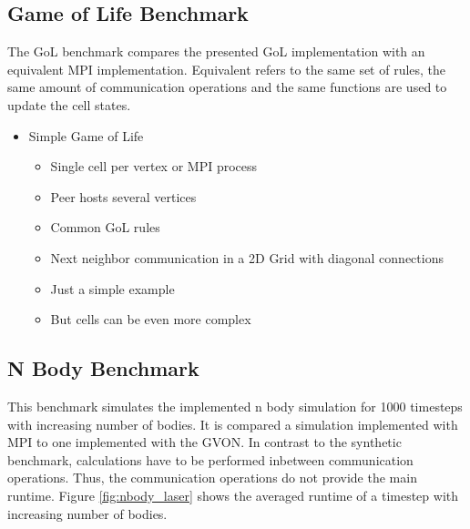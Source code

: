 \subsection{Game of Life Benchmark}
The GoL benchmark compares the presented GoL implementation with an
equivalent MPI implementation. Equivalent refers to the same set of
rules, the same amount of communication operations and the same
functions are used to update the cell states.


\begin{itemize}
\item Simple Game of Life
  \begin{itemize}
  \item Single cell per vertex or MPI process
  \item Peer hosts several vertices
  \item Common GoL rules
  \item Next neighbor communication in a 2D Grid with diagonal connections
  \item Just a simple example
  \item But cells can be even more complex
  \end{itemize}
\end{itemize}

\subsection{N Body Benchmark}
This benchmark simulates the implemented n body simulation for 1000
timesteps with increasing number of bodies. It is compared a
simulation implemented with MPI to one implemented with the GVON. In
contrast to the synthetic benchmark, calculations have to be performed
inbetween communication operations. Thus, the communication operations
do not provide the main runtime. Figure \ref{fig:nbody_laser} shows
the averaged runtime of a timestep with increasing number of bodies.

